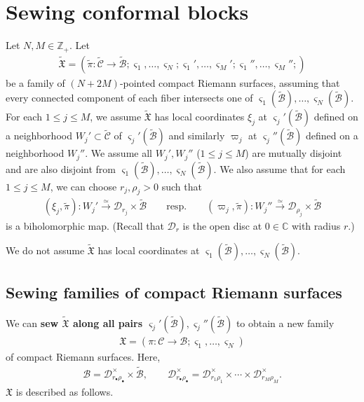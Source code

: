\documentclass[12pt,a4paper,notitlepage]{article}
\theoremstyle{definition}
\theoremstyle{plain}
\newcommand{\fk}{\mathfrak}
\newcommand{\mc}{\mathcal}
\newcommand{\wtd}{\widetilde}
\newcommand{\sgm}{\varsigma}
\newcommand{\blt}{\bullet}
\newcommand{\Cbb}{\mathbb C}
\newcommand{\Zbb}{\mathbb Z}
\numberwithin{equation}{section}
\begin{document}
\section{Sewing conformal blocks}\label{lb18}

Let $N,M\in\Zbb_+$. Let
\begin{align*}
\wtd{\fk X}=(\wtd\pi:\wtd{\mc C}\rightarrow\wtd{\mc B};\sgm_1,\dots,\sgm_N;\sgm_1',\dots,\sgm_M';\sgm_1'',\dots,\sgm_M'';)
\end{align*}
be a family of $(N+2M)$-pointed compact Riemann surfaces, assuming that every connected component of each fiber intersects one of $\sgm_1(\wtd{\mc B}),\dots,\sgm_N(\wtd{\mc B})$.  For each $1\leq j\leq M$,  we assume $\wtd{\fk X}$ has  local coordinates $\xi_j$ at $\sgm_j'(\wtd{\mc B})$ defined on a neighborhood $W_j'\subset\wtd{\mc C}$ of $\sgm_j'(\wtd{\mc B})$ and similarly $\varpi_j$ at $\sgm_j''(\wtd{\mc B})$ defined on a neighborhood $W_j''$. We assume all $W_j',W_j''$ ($1\leq j\leq M$) are mutually disjoint and are also disjoint from $\sgm_1(\wtd{\mc B}),\dots,\sgm_N(\wtd {\mc B})$. We also assume that for each $1\leq j\leq M$, we can choose $r_j,\rho_j>0$  such that
\begin{gather}
	(\xi_j,\wtd\pi):W_j'\xrightarrow{\simeq} \mc D_{r_j}\times\wtd{\mc B}\qquad\text{resp.}\qquad (\varpi_j,\wtd\pi):W_j''\xrightarrow{\simeq} \mc D_{\rho_j}\times\wtd{\mc B}\label{eq94}
\end{gather}
is a biholomorphic map. (Recall that $\mc D_r$ is the open disc at $0\in\Cbb$ with radius $r$.) 

We do not assume $\wtd{\fk X}$ has local coordinates at $\sgm_1(\wtd{\mc B}),\dots,\sgm_N(\wtd{\mc B})$.



\subsection*{Sewing families of compact Riemann surfaces}


We can \textbf{sew $\wtd{\fk X}$ along all pairs $\sgm_j'(\wtd{\mc B}),\sgm_j''(\wtd{\mc B})$} to obtain a new family
\begin{align}
\fk X=(\pi:\mc C\rightarrow\mc B;\sgm_1,\dots,\sgm_N)	
\end{align}
of compact Riemann surfaces. Here, \index{Drrho@$\mc D_{r_\blt\rho_\blt}^\times$}
\begin{gather*}
\mc B=	\mc D^\times_{r_\blt\rho_\blt}\times\wtd{\mc B},\qquad \mc D^\times_{r_\blt\rho_\blt}=\mc D^\times_{r_1\rho_1}\times\cdots\times\mc D^\times_{r_M\rho_M}.
\end{gather*}
$\fk X$ is described as follows.
\end{document}
